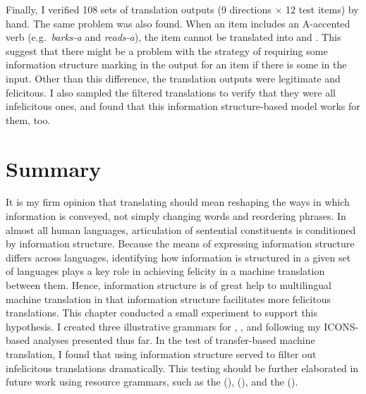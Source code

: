 Finally, I verified 108 sets of translation outputs (9 directions
\ensuremath{\times} 12 test items) by hand. The same problem was also
found. When an  item includes an A-accented verb
(e.g.\ \textit{barks-a} and \textit{reads-a}), the item
cannot be translated into  and . This
suggest that there might be a problem with the strategy of requiring
some information structure marking in the output for an item if there
is some in the input.  Other than this difference, the translation
outputs were legitimate and felicitous.  I also sampled the filtered
translations to verify that they were all infelicitous ones, and found
that this information structure-based model works for them, too.




\section{Summary}
\label{13:sec:sum}

It is my firm opinion that translating should mean reshaping the ways
in which information is conveyed, not simply changing words and
reordering phrases.  In almost all human languages, articulation of
sentential constituents is conditioned by information
structure. Because the means of expressing information structure
differs across languages, identifying how information is structured in
a given set of languages plays a key role in achieving felicity in a
machine translation between them. Hence, information
structure is of great help to multilingual machine translation in that
information structure facilitates more felicitous translations.  This
chapter conducted a small experiment to support this
hypothesis. I created three illustrative
grammars for , , and  following my
ICONS-based analyses presented thus far. In the test of transfer-based
machine translation, I found that using information
structure served to filter out infelicitous translations
dramatically. This testing should be further elaborated in future work
using resource grammars, such as the 
(\citealt{flickinger:00}),  (\citealt{siegel:etal:16}),
and the  (\citealt{kim:etal:11}).


